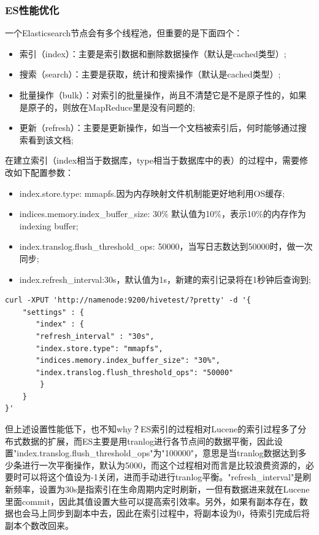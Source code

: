 \subsubsection{ES性能优化}
\par 一个Elasticsearch节点会有多个线程池，但重要的是下面四个：
\begin{itemize}
\item 索引（index）：主要是索引数据和删除数据操作（默认是cached类型）;
\item 搜索（search）：主要是获取，统计和搜索操作（默认是cached类型）;
\item 批量操作（bulk）：对索引的批量操作，尚且不清楚它是不是原子性的，如果是原子的，则放在MapReduce里是没有问题的;
\item 更新（refresh）：主要是更新操作，如当一个文档被索引后，何时能够通过搜索看到该文档;
\end{itemize}
\par 在建立索引（index相当于数据库，type相当于数据库中的表）的过程中，需要修改如下配置参数：
\begin{itemize}
\item index.store.type: mmapfs.因为内存映射文件机制能更好地利用OS缓存;
\item indices.memory.index\_buffer\_size: 30\% 默认值为10\%，表示10\%的内存作为indexing buffer;
\item index.translog.flush\_threshold\_ops: 50000，当写日志数达到50000时，做一次同步;
\item index.refresh\_interval:30s，默认值为1s，新建的索引记录将在1秒钟后查询到;
\end{itemize}
\begin{verbatim}
curl -XPUT 'http://namenode:9200/hivetest/?pretty' -d '{
    "settings" : {
       "index" : {
       "refresh_interval" : "30s",
       "index.store.type": "mmapfs",
       "indices.memory.index_buffer_size": "30%",
       "index.translog.flush_threshold_ops": "50000"
        }
    }
}'
\end{verbatim}
\par 但上述设置性能低下，也不知why？ES索引的过程相对Lucene的索引过程多了分布式数据的扩展，而ES主要是用tranlog进行各节点间的数据平衡，因此设置"index.translog.flush\_threshold\_ops"为"100000"，意思是当tranlog数据达到多少条进行一次平衡操作，默认为5000，而这个过程相对而言是比较浪费资源的，必要时可以将这个值设为-1关闭，进而手动进行tranlog平衡。"refresh\_interval"是刷新频率，设置为30s是指索引在生命周期内定时刷新，一但有数据进来就在Lucene里面commit，因此其值设置大些可以提高索引效率。另外，如果有副本存在，数据也会马上同步到副本中去，因此在索引过程中，将副本设为0，待索引完成后将副本个数改回来。
